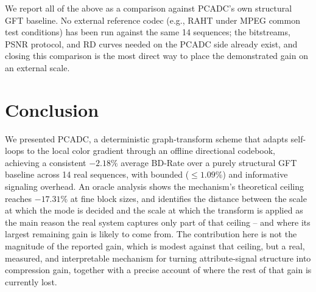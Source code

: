 \documentclass[conference]{IEEEtran}
\begin{document}
We report all of the above as a comparison against PCADC's own structural GFT baseline. No
external reference codec (e.g., RAHT under MPEG common test conditions) has been run against
the same 14 sequences; the bitstreams, PSNR protocol, and RD curves needed on the PCADC side
already exist, and closing this comparison is the most direct way to place the demonstrated
gain on an external scale.

\section{Conclusion}
We presented PCADC, a deterministic graph-transform scheme that adapts self-loops to the local
color gradient through an offline directional codebook, achieving a consistent $-2.18\%$ average
BD-Rate over a purely structural GFT baseline across 14 real sequences, with bounded
($\le1.09\%$) and informative signaling overhead. An oracle analysis shows the mechanism's
theoretical ceiling reaches $-17.31\%$ at fine block sizes, and identifies the distance between
the scale at which the mode is decided and the scale at which the transform is applied as the
main reason the real system captures only part of that ceiling -- and where its largest
remaining gain is likely to come from. The contribution here is not the magnitude of the
reported gain, which is modest against that ceiling, but a real, measured, and interpretable
mechanism for turning attribute-signal structure into compression gain, together with a precise
account of where the rest of that gain is currently lost.
\end{document}
